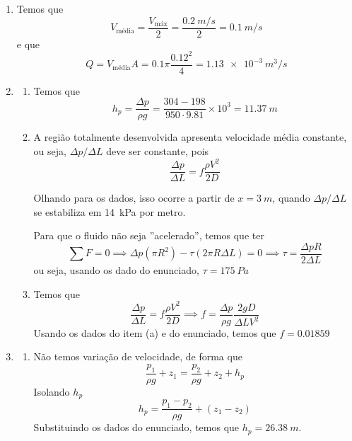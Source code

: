 \documentclass[12pt,a4paper,brazilian]{article}
\def\Description{Fenômenos de Transporte -- Prova 2}
\begin{document}
\newpage
\def\Description{Fenômenos de Transporte -- Gabarito}

\begin{enumerate}
    \item Temos que 
        \[
            V_\text{média}=\frac{V_\text{máx}}{2}=\frac{\SI{0.2}{m/s}}{2} = \SI{0.1}{m/s}
        \]
        e que
        \[
            Q=V_\text{média} A = \num{0.1} \pi \frac{\num{0.12}^2}{4} = \SI{1.13e-3}{m^3/s}
        \]

    \item%
        \begin{enumerate}
            \item Temos que
                \[
                    h_p = \frac{\Delta p}{\rho g} = \frac{304-198}{950 \cdot \num{9.81}}\times 10^3 =
                    \SI{11.37}{m}
                \]

            \item A região totalmente desenvolvida apresenta velocidade média constante, ou seja,
                \(\Delta p/\Delta L\) deve ser constante, pois
                \[
                    \frac{\Delta p}{\Delta L}=f\frac{\rho V^2}{2D}
                \]

                Olhando para os dados, isso ocorre a partir de \(x=
                \SI{3}{m}\), quando \(\Delta p/\Delta L\) se estabiliza em
                \SI{14}{kPa} por metro.

                Para que o fluido não seja ''acelerado'', temos que ter
                \[
                    \sum F = 0 \implies \Delta p (\pi R^2) - \tau (2\pi R \Delta L) =0 \implies
                    \tau = \frac{\Delta p R}{2\Delta L}
                \]
                ou seja, usando os dado do enunciado, \(\tau = \SI{175}{Pa}\)

            \item Temos que 
                \[
                    \frac{\Delta p}{\Delta L}=f\frac{\rho V^2}{2D} \implies
                    f = \frac{\Delta p}{\rho g}\frac{2 g D}{\Delta L V^2} 
                \]
                Usando os dados do item (a) e do enunciado, temos que
                \(f=\num{0.01859}\)
        \end{enumerate}
    \item%
        \begin{enumerate}
            \item Não temos variação de velocidade, de forma que
                \[
                    \frac{p_1}{\rho g}+z_1 = \frac{p_2}{\rho g}+z_2 + h_p
                \]
                Isolando \(h_p\)
                \[
                    h_p = \frac{p_1 - p_2}{\rho g} + (z_1-z_2)
                \]
                Substituindo os dados do enunciado, temos que \(h_p = \SI{26.38}{m}\).


\end{enumerate}
\end{enumerate}
\end{document}

